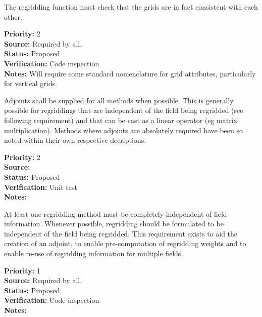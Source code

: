 
The regridding function must check that the grids are in fact consistent
with each other.

\begin{reqlist}
{\bf Priority:} 2 \\
{\bf Source:} Required by all. \\
{\bf Status:} Proposed \\
{\bf Verification:} Code inspection  \\
{\bf Notes:} Will require some standard nomenclature for grid attributes,
             particularly for vertical grids.
\end{reqlist}


Adjoints shall be supplied for all methods when possible.  This is generally
possible for regriddings that are independent of the field being regridded
(see following requirement) and that can be cast as a linear operator (eg
matrix multiplication).  Methods where adjoints are absolutely required
have been so noted within their own respective decriptions.

\begin{reqlist}
{\bf Priority:} 2 \\
{\bf Source:} \\
{\bf Status:} Proposed \\
{\bf Verification:} Unit test \\
{\bf Notes:} 
\end{reqlist}


At least one regridding method must be completely independent of
field information.  Whenever possible, regridding should be formulated to be 
independent of the field being regridded.  This requirement exists to
aid the creation of an adjoint, to enable pre-computation of regridding weights
and to enable re-use of regridding information for multiple fields.

\begin{reqlist}
{\bf Priority:} 1 \\
{\bf Source:} Required by all. \\
{\bf Status:} Proposed \\
{\bf Verification:} Code inspection  \\
{\bf Notes:} 
\end{reqlist}

